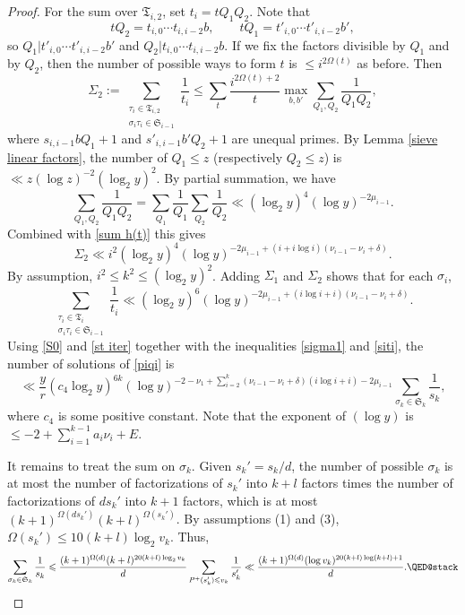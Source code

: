 \documentclass[11pt]{amsart}
\theoremstyle{remark}
\theoremstyle{plain}
\numberwithin{equation}{section}
\newcommand{\be}{\begin{equation}}
\newcommand{\ee}{\end{equation}}
\renewcommand{\(}{\left(}
\renewcommand{\)}{\right)}
\renewcommand{\le}{\leqslant}
\renewcommand{\d}{\delta}
\newcommand{\om}{\Omega}
\begin{document}
\begin{proof}
For the sum over $\mathfrak T_{i,2}$, set $t_{i}=tQ_1Q_2$.  
Note that
$$
t Q_2 = t_{i,0} \cdots t_{i,i-2}b, \qquad tQ_1 = t'_{i,0} \cdots 
t'_{i,i-2} b',
$$
so $Q_1|t'_{i,0} \cdots t'_{i,i-2} b'$ and $Q_2|t_{i,0} \cdots t_{i,i-2}b$.
 If we fix the factors divisible by $Q_1$ and by $Q_2$, then the
number of possible ways to form $t$ is $\le i^{2\om(t)}$ as before.
Then
$$
\Sigma_2 := \sum_{\substack{ \tau_i\in \mathfrak T_{i,2} \\ \sigma_i\tau_i\in \mathfrak S_{i-1}}} \frac{1}{t_i}
 \le \sum_t \frac{i^{2\om(t)+2}}{t} \max_{b,b'} \sum_{Q_1,Q_2} \frac1{Q_1 Q_2},
$$
where $s_{i,i-1}bQ_1+1$ and $s'_{i,i-1}b'Q_2+1$ are unequal primes.
By Lemma \ref{sieve linear factors}, the
number of $Q_1\le z$ (respectively $Q_2\le z$) is $\ll z(\log z)^{-2}
(\log_2 y)^2$. By  partial summation, we have
$$
\sum_{Q_1,Q_2} \frac1{Q_1Q_2} = \sum_{Q_1} \frac1{Q_1} \sum_{Q_2}
\frac1{Q_2} \ll (\log_2 y)^4 (\log y)^{-2\mu_{i-1}}.
$$
Combined with \eqref{sum h(t)} this gives
$$
\Sigma_2 \ll i^2 (\log_2 y)^4 (\log y)^{-2 \mu_{i-1} +
(i+i\log i)(\nu_{i-1}-\nu_{i}+\d) }.
$$
By assumption, $i^2\le k^2 \le (\log_2 y)^2$.  Adding
$\Sigma_1$ and $\Sigma_2$ shows that for each $\sigma_i$,
\be\label{siti}
\sum_{\substack{ \tau_i \in \mathfrak T_i \\  \sigma_i\tau_i \in \mathfrak S_{i-1} }} \frac1{t_i}
\ll (\log_2 y)^6 (\log y)^{-2\mu_{i-1} +
 (i\log i + i)(\nu_{i-1}-\nu_{i}+\d)}.
\ee
Using \eqref{S0} and \eqref{st iter} together with the inequalities
\eqref{sigma1} and \eqref{siti},
the number of solutions of \eqref{piqi} is
\[
\ll \frac{y}{r}(c_4 \log_2 y)^{6k}
(\log y)^{-2-\nu_{1} + \sum_{i=2}^k (\nu_{i-1} - \nu_{i}+\d)(i\log i + i)
 - 2\mu_{i-1} } \sum_{\sigma_k \in \mathfrak S_k}
\frac1{s_k},
\]
where $c_4$ is some positive constant.  Note that the exponent 
of $(\log y)$ is $\le -2+\sum_{i=1}^{k-1} a_i \nu_i + E$.

It remains to treat the sum on $\sigma_k$.
Given $s_k'=s_k/d$, the number of possible $\sigma_k$ is
 at most the number of factorizations of $s_k'$ into $k+l$ factors
times the number of factorizations of $ds_k'$ into $k+1$ factors,
which is at most $(k+1)^{\Omega(ds_k')} (k+l)^{\Omega(s_k')}$.
By assumptions (1) and (3), $\Omega(s_k')\le 10(k+l)\log_2 v_k$.
Thus,
\[
\sum_{\sigma_k \in \mathfrak S_k} \frac1{s_k} \le \frac{(k+1)^{\Omega(d)}
(k+l)^{20(k+l)\log_2 v_k}}{d} \sum_{P^+(s_k')\le v_k} \frac{1}{s_k'}
\ll \frac{(k+1)^{\Omega(d)} (\log v_k)^{20(k+l)\log(k+l)+1}}{d}.
\qedhere
\]
\end{proof}
\end{document}
